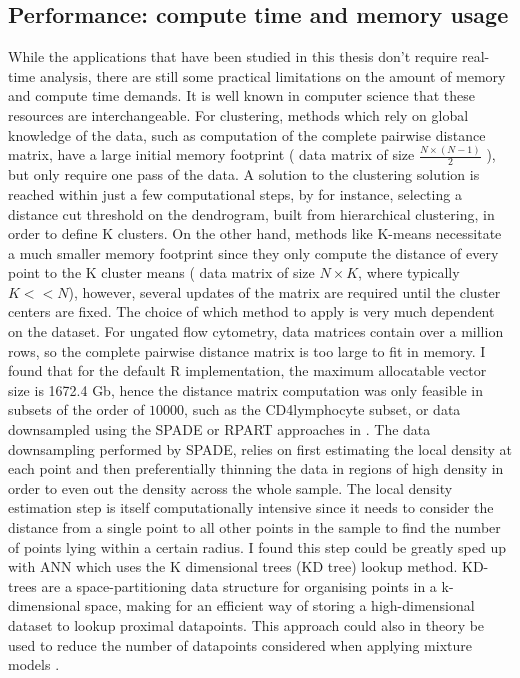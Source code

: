 \subsection{Performance: compute time and memory usage}
While the applications that have been studied in this thesis don’t require real-time analysis, there are still some practical limitations on the amount of memory and compute time demands.
It is well known in computer science that these resources are interchangeable.
For clustering, methods which rely on global knowledge of the data, such as computation of the complete pairwise distance matrix, have a large initial memory footprint ( data matrix of size $\frac{N \times (N-1)}{2}$ ), but only require one pass of the data.
A solution to the clustering solution is reached within just a few computational steps, by for instance,
selecting a distance cut threshold on the dendrogram, built from hierarchical clustering, in order to define K clusters. 
On the other hand, methods like K-means necessitate a much smaller memory footprint since they only compute the distance of every point to the K cluster means ( data matrix of size $N \times K$, where typically $K << N$), however, several updates of the matrix are required until the cluster centers are fixed.
The choice of which method to apply is very much dependent on the dataset.
For ungated flow cytometry, data matrices  contain over a million rows, so the complete pairwise distance matrix is too large to fit in memory.
I found that for the default R implementation, the maximum allocatable vector size is 1672.4 Gb, hence the distance matrix computation was only feasible in subsets of the order of $10000$, such as the CD4\positive lymphocyte subset, or data downsampled using the SPADE or RPART approaches in .
The data downsampling performed by SPADE, relies on first estimating the local density at each point and then preferentially thinning the data in regions of high density in order to even out the density across the whole sample.
The local density estimation step is itself computationally intensive since it needs to consider the distance from a single point to all other points in the sample to find the number of points lying within a certain radius.
I found this step could be greatly sped up with \acrfull{ANN} which uses the K dimensional trees (KD tree) lookup method.
KD-trees are a space-partitioning data structure for organising points in a k-dimensional space, making for an efficient way of storing a high-dimensional dataset to lookup proximal datapoints.
This approach could also in theory be used to reduce the number of datapoints considered when applying mixture models \citep{McLachlan:2004uw}.

